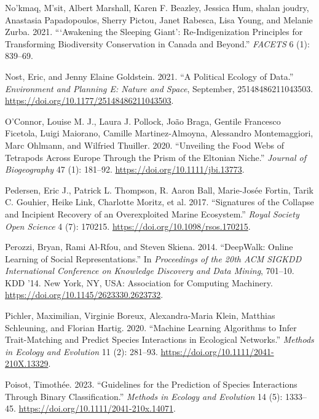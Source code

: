 \documentclass[
  letterpaper,
  DIV=11,
  numbers=noendperiod]{scrartcl}
\newlength{\cslhangindent}
\newlength{\cslentryspacingunit} %
\newenvironment{CSLReferences}[2] %
 {%
  \setlength{\parindent}{0pt}
  \ifodd #1
  \let\oldpar\par
  \def\par{\hangindent=\cslhangindent\oldpar}
  \fi
  \setlength{\parskip}{#2\cslentryspacingunit}
 }%
 {}
\begin{document}
\begin{CSLReferences}{1}{0}
\leavevmode{}%
No'kmaq, M'sit, Albert Marshall, Karen F. Beazley, Jessica Hum, shalan
joudry, Anastasia Papadopoulos, Sherry Pictou, Janet Rabesca, Lisa
Young, and Melanie Zurba. 2021. {``{`{Awakening} the Sleeping Giant'}:
Re-{Indigenization} Principles for Transforming Biodiversity
Conservation in {Canada} and Beyond.''} \emph{FACETS} 6 (1): 839--69.

\leavevmode{}%
Nost, Eric, and Jenny Elaine Goldstein. 2021. {``A Political Ecology of
Data.''} \emph{Environment and Planning E: Nature and Space}, September,
25148486211043503. \url{https://doi.org/10.1177/25148486211043503}.

\leavevmode{}%
O'Connor, Louise M. J., Laura J. Pollock, João Braga, Gentile Francesco
Ficetola, Luigi Maiorano, Camille Martinez‐Almoyna, Alessandro
Montemaggiori, Marc Ohlmann, and Wilfried Thuiller. 2020. {``Unveiling
the Food Webs of Tetrapods Across {Europe} Through the Prism of the
{Eltonian} Niche.''} \emph{Journal of Biogeography} 47 (1): 181--92.
\url{https://doi.org/10.1111/jbi.13773}.

\leavevmode{}%
Pedersen, Eric J., Patrick L. Thompson, R. Aaron Ball, Marie-Josée
Fortin, Tarik C. Gouhier, Heike Link, Charlotte Moritz, et al. 2017.
{``Signatures of the Collapse and Incipient Recovery of an Overexploited
Marine Ecosystem.''} \emph{Royal Society Open Science} 4 (7): 170215.
\url{https://doi.org/10.1098/rsos.170215}.

\leavevmode{}%
Perozzi, Bryan, Rami Al-Rfou, and Steven Skiena. 2014. {``{DeepWalk}:
Online Learning of Social Representations.''} In \emph{Proceedings of
the 20th {ACM SIGKDD} International Conference on {Knowledge} Discovery
and Data Mining}, 701--10. {KDD} '14. {New York, NY, USA}: {Association
for Computing Machinery}. \url{https://doi.org/10.1145/2623330.2623732}.

\leavevmode{}%
Pichler, Maximilian, Virginie Boreux, Alexandra-Maria Klein, Matthias
Schleuning, and Florian Hartig. 2020. {``Machine Learning Algorithms to
Infer Trait-Matching and Predict Species Interactions in Ecological
Networks.''} \emph{Methods in Ecology and Evolution} 11 (2): 281--93.
\url{https://doi.org/10.1111/2041-210X.13329}.

\leavevmode{}%
Poisot, Timothée. 2023. {``Guidelines for the Prediction of Species
Interactions Through Binary Classification.''} \emph{Methods in Ecology
and Evolution} 14 (5): 1333--45.
\url{https://doi.org/10.1111/2041-210x.14071}.


\end{CSLReferences}
\end{document}
